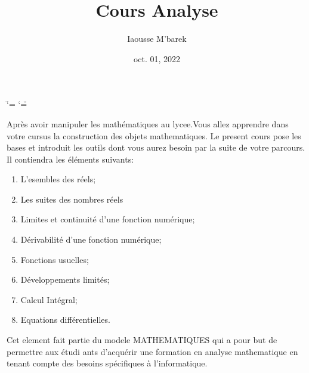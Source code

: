 \documentclass[letterpaper,10pt,french]{jupyterBook}
\title{Cours Analyse}
\date{oct. 01, 2022}
\author{Iaousse M'barek}
\begin{document}
\ifdefined\shorthandoff
  \ifnum\catcode`\=\string=\active\shorthandoff{=}\fi
  \ifnum\catcode`\"=\active{}\fi
\fi

\pagestyle{empty}
\sphinxmaketitle
\pagestyle{plain}
\sphinxtableofcontents
\pagestyle{normal}
\label{\detokenize{intro::doc}}


\sphinxAtStartPar
Après avoir manipuler les mathématiques au lycee.Vous allez apprendre dans votre cursus la construction des objets mathematiques. Le present cours pose les bases et introduit les outils dont vous aurez besoin par la suite de votre parcours. Il contiendra les éléments suivants:
\begin{enumerate}
%
\item {} 
\sphinxAtStartPar
L’esembles des réels;

\item {} 
\sphinxAtStartPar
Les suites des nombres réels

\item {} 
\sphinxAtStartPar
Limites et continuité d’une fonction numérique;

\item {} 
\sphinxAtStartPar
Dérivabilité d’une fonction numérique;

\item {} 
\sphinxAtStartPar
Fonctions usuelles;

\item {} 
\sphinxAtStartPar
Développements limités;

\item {} 
\sphinxAtStartPar
Calcul Intégral;

\item {} 
\sphinxAtStartPar
Equations différentielles.

\end{enumerate}

\sphinxAtStartPar
Cet element fait partie du modele MATHEMATIQUES qui a pour but de permettre aux étudi\sphinxhyphen{}
ants d’acquérir une formation en analyse mathematique en tenant compte des besoins spécifiques
à l’informatique.
\end{document}
